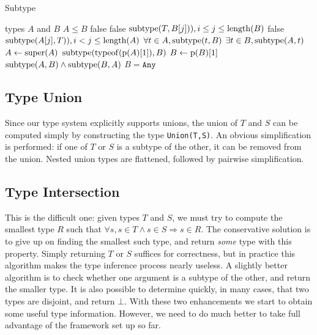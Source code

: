 \begin{algorithm}
\caption{Subtype}
\label{alg3}
\begin{algorithmic}
\REQUIRE types $A$ and $B$
\ENSURE $A \leq B$
  \RETURN false
 \ENDIF
    \RETURN false
   \ENDIF
   \RETURN $\operatorname{subtype}(T,B[j])), i \leq j \leq \operatorname{length}(B)$
   \RETURN false
   \RETURN $\operatorname{subtype}(A[j],T)), i < j \leq \operatorname{length}(A)$
  \ENDIF
 \ENDFOR
{}
 \RETURN $\forall t \in A, \operatorname{subtype}(t,B)$
 \RETURN $\exists t \in B, \operatorname{subtype}(A,t)$
\ENDIF
{}
 \ENDIF
 \STATE $A \leftarrow \operatorname{super}(A)$
\ENDWHILE
{}
 \RETURN $\operatorname{subtype}(\operatorname{typeof}(\operatorname{p}(A)[1]),B)$
 \STATE $B \leftarrow \operatorname{p}(B)[1]$
 \RETURN $\operatorname{subtype}(A,B) \land \operatorname{subtype}(B,A)$
\ENDIF
\RETURN $B = \texttt{Any}$
\end{algorithmic}
\end{algorithm}


\subsection{Type Union}

Since our type system explicitly supports unions, the union of $T$ and
$S$ can be computed simply by constructing the type {\tt Union(T,S)}.
An obvious simplification is performed: if one of $T$ or $S$ is a
subtype of the other, it can be removed from the union. Nested union
types are flattened, followed by pairwise simplification.

\subsection{Type Intersection}

This is the difficult one: given types $T$ and $S$, we must try to compute
the smallest type $R$ such that
$\forall s, s \in T \land s \in S \Rightarrow s \in R$.
The conservative solution is to give up on finding the smallest such type, and
return \emph{some} type with this property. Simply returning $T$ or $S$
suffices for correctness, but in practice this algorithm
makes the type inference process nearly useless. A slightly better
algorithm is to check whether one argument is a subtype of the other, and
return the smaller type. It is also possible to determine quickly, in
many cases, that two types are disjoint, and return $\bot$. With these
two enhancements we start to obtain some useful type information. However,
we need to do much better to take full advantage of the framework set up
so far.

